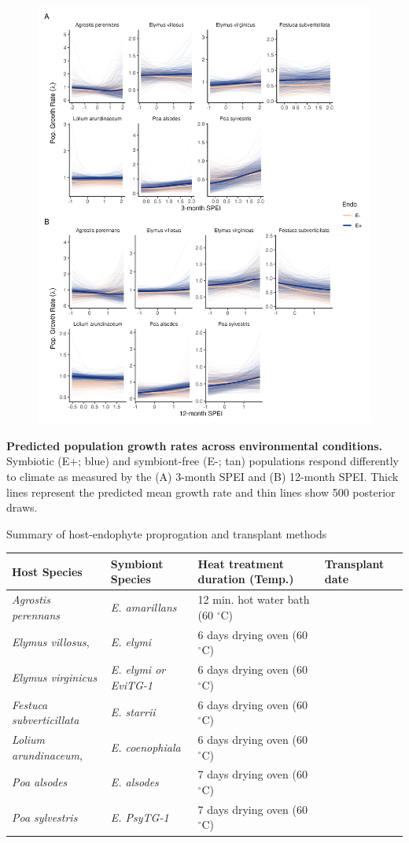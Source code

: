 \documentclass[12pt]{article}
\begin{document}
\begin{figure}
	\centering
	\includegraphics[width=.7\linewidth]{figS10_spei_combo_lambda_plot.png}
\end{figure}
 \textbf{Predicted population growth rates across environmental conditions.} Symbiotic (E+; blue) and symbiont-free (E-; tan) populations respond differently to climate as measured by the (A) 3-month SPEI and (B) 12-month SPEI. Thick lines represent the predicted mean growth rate and thin lines show 500 posterior draws.
\newpage

 Summary of host-endophyte proprogation and transplant methods\\
\begin{table}[ht]
	\begin{adjustbox}{width=1\textwidth}
\begin{tabular}{llll}

	\bf{Host Species} & \bf{Symbiont Species} & \bf{Heat treatment duration (Temp.)}& \bf{Transplant date }\\
	        \hline
	\emph{Agrostis perennans} & \emph{E. amarillans}&12 min. hot water bath (60 $^{\circ}$C)&\\
	\emph{Elymus villosus}, &\emph{E. elymi}&6 days drying oven (60 $^{\circ}$C)&\\
	\emph{Elymus virginicus} &\emph{E. elymi or EviTG-1}&6 days drying oven (60 $^{\circ}$C)&\\
	 \emph{Festuca subverticillata} &\emph{E. starrii}&6 days drying oven (60 $^{\circ}$C)&\\
	 \emph{Lolium arundinaceum}, &\emph{E. coenophiala}&6 days drying oven (60 $^{\circ}$C)& \\
	 \emph{Poa alsodes} &\emph{E. alsodes}& 7 days drying oven (60 $^{\circ}$C)&\\
	 \emph{Poa sylvestris}&\emph{E. PsyTG-1}&7 days drying oven (60 $^{\circ}$C)& \\
\end{tabular}
\end{adjustbox}
\end{table}
\end{document}
